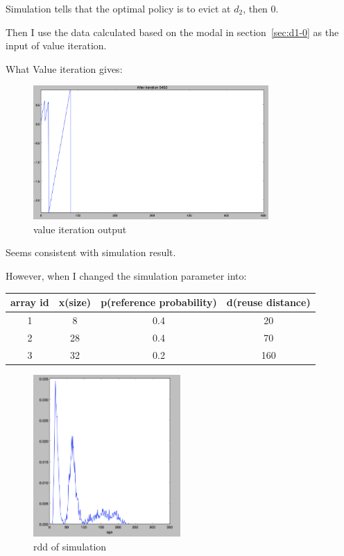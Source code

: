 \documentclass[12pt, letterpaper]{article}
\begin{document}
Simulation tells that the optimal policy is to evict at $d_2$, then 0.

Then I use the data calculated based on the modal in section~\ref{sec:d1-0} as
the input of value iteration. 

What Value iteration gives:
\begin{figure}[H]
\centering
\includegraphics[width=0.8\textwidth]{vi-output-1.png}
\caption{value iteration output}
\end{figure}

Seems consistent with simulation result.

However, when I changed the simulation parameter into:

\begin{center}
\begin{tabular}{ c | c c c}
\hline
array id & x(size) & p(reference probability) & d(reuse distance) \\
\hline
1 & 8 & 0.4 & 20 \\
2 & 28 & 0.4 & 70 \\
3 & 32 & 0.2 & 160 \\
\hline
\end{tabular}

\begin{figure}[H]
\centering
\includegraphics[width=0.5\textwidth]{trimodal-rdd-random-2.png}
\caption{rdd of simulation}
\end{figure}
\end{center}
\end{document}
